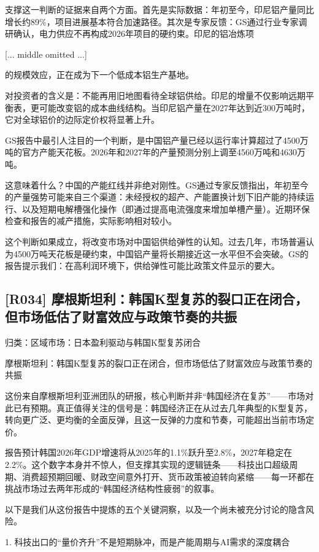 \documentclass[11pt]{ctexart}
\begin{document}
支撑这一判断的证据来自两个方面。首先是实际数据：年初至今，印尼铝产量同比增长约89\%，项目进展基本符合加速路径。其次是专家反馈：GS通过行业专家调研确认，电力供应不再构成2026年项目的硬约束。印尼的铝冶炼项

[... middle omitted ...]

的规模效应，正在成为下一个低成本铝生产基地。

对投资者的含义是：不能再用旧地图看待全球铝供给。印尼的增量不仅影响远期平衡表，更可能改变铝的成本曲线结构。当印尼铝产量在2027年达到近300万吨时，它对全球铝价的边际定价权将显著上升。

GS报告中最引人注目的一个判断，是中国铝产量已经以运行率计算超过了4500万吨的官方产能天花板。2026年和2027年的产量预测分别上调至4560万吨和4630万吨。

这意味着什么？中国的产能红线并非绝对刚性。GS通过专家反馈指出，年初至今的产量强势可能来自三个渠道：未经授权的超产、产能置换计划下旧产能的持续运行、以及短期电解槽强化操作（即通过提高电流强度来增加单槽产量）。近期环保检查和报告的减产措施，实际影响相对较小。

这个判断如果成立，将改变市场对中国铝供给弹性的认知。过去几年，市场普遍认为4500万吨天花板是硬约束，中国铝产量将长期接近这一水平但不会突破。GS的报告提示我们：在高利润环境下，供给弹性可能比政策文件显示的要大。

\subsection{[R034] 摩根斯坦利：韩国K型复苏的裂口正在闭合，但市场低估了财富效应与政策节奏的共振}
{\small\color{refgray}归类：区域市场：日本盈利驱动与韩国K型复苏闭合}

摩根斯坦利：韩国K型复苏的裂口正在闭合，但市场低估了财富效应与政策节奏的共振

这份来自摩根斯坦利亚洲团队的研报，核心判断并非“韩国经济在复苏”——市场对此已有预期。真正值得关注的信号是：韩国经济正在从过去几年典型的K型复苏，转向更广泛、更均衡的全面反弹，且这一反弹的力度和节奏，可能超出当前市场定价。

报告预计韩国2026年GDP增速将从2025年的1.1\%跃升至2.8\%，2027年稳定在2.2\%。这个数字本身并不惊人，但支撑其实现的逻辑链条——科技出口超级周期、消费超预期回暖、财政空间意外打开、货币政策被迫转向紧缩——每一环都在挑战市场过去两年形成的“韩国经济结构性疲弱”的叙事。

以下是我们从这份报告中提炼的五个关键洞察，以及一个尚未被充分讨论的隐含风险。

1. 科技出口的“量价齐升”不是短期脉冲，而是产能周期与AI需求的深度耦合
\end{document}
